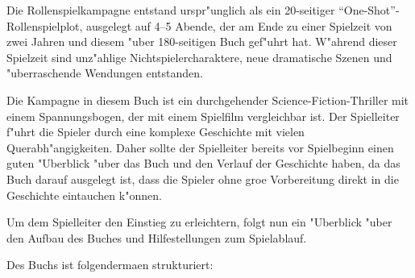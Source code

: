 
Die Rollenspielkampagne entstand urspr"unglich als ein 20-seitiger ``One-Shot''-Rollenspielplot, ausgelegt auf 4--5 Abende, der am Ende zu einer Spielzeit von zwei Jahren und diesem "uber 180-seitigen Buch gef"uhrt hat. W"ahrend dieser Spielzeit sind unz"ahlige Nichtspielercharaktere, neue dramatische Szenen und "uberraschende Wendungen entstanden.

Die Kampagne in diesem Buch ist ein durchgehender Science-Fiction-Thriller mit einem Spannungsbogen, der mit einem Spielfilm vergleichbar ist. Der Spielleiter f"uhrt die Spieler durch eine komplexe Geschichte mit vielen Querabh"angigkeiten. Daher sollte der Spielleiter bereits vor Spielbeginn einen guten "Uberblick "uber das Buch und den Verlauf der Geschichte haben, da das Buch darauf ausgelegt ist, dass die Spieler ohne gro\3e Vorbereitung direkt in die Geschichte eintauchen k"onnen.

Um dem Spielleiter den Einstieg zu erleichtern, folgt nun ein "Uberblick "uber den Aufbau des Buches und Hilfestellungen zum Spielablauf.


Des Buchs ist folgenderma\3en strukturiert:

